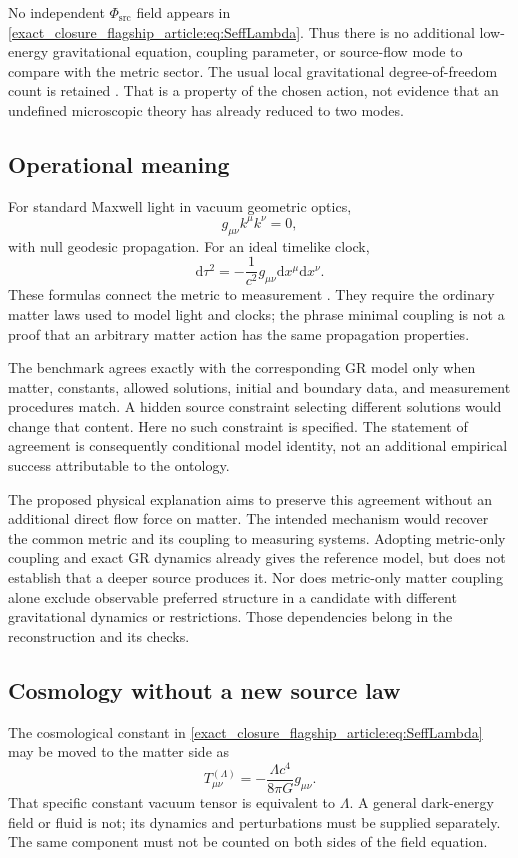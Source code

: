 \documentclass[11pt,oneside]{report}
\newcommand{\PhiSrc}{\Phi_{\mathrm{src}}}
\newcommand{\dd}{\mathrm d}
\theoremstyle{remark}
\numberwithin{definition}{chapter}
\numberwithin{proposition}{chapter}
\numberwithin{remark}{chapter}
\begin{document}
No independent $\PhiSrc$ field appears in \eqref{exact_closure_flagship_article:eq:SeffLambda}. Thus there is no additional low-energy gravitational equation, coupling parameter, or source-flow mode to compare with the metric sector. The usual local gravitational degree-of-freedom count is retained \parencite{ADM1962}. That is a property of the chosen action, not evidence that an undefined microscopic theory has already reduced to two modes.

\subsection{Operational meaning}
For standard Maxwell light in vacuum geometric optics,
\begin{equation}
g_{\mu\nu}k^\mu k^\nu=0,
\label{exact_closure_flagship_article:eq:null}
\end{equation}
with null geodesic propagation. For an ideal timelike clock,
\begin{equation}
\dd\tau^2=-\frac1{c^2}g_{\mu\nu}\dd x^\mu\dd x^\nu.
\label{exact_closure_flagship_article:eq:tau}
\end{equation}
These formulas connect the metric to measurement \parencite{Carroll1997}. They require the ordinary matter laws used to model light and clocks; the phrase minimal coupling is not a proof that an arbitrary matter action has the same propagation properties.

The benchmark agrees exactly with the corresponding GR model only when matter, constants, allowed solutions, initial and boundary data, and measurement procedures match. A hidden source constraint selecting different solutions would change that content. Here no such constraint is specified. The statement of agreement is consequently conditional model identity, not an additional empirical success attributable to the ontology.

The proposed physical explanation aims to preserve this agreement without an additional direct flow force on matter. The intended mechanism would recover the common metric and its coupling to measuring systems. Adopting metric-only coupling and exact GR dynamics already gives the reference model, but does not establish that a deeper source produces it. Nor does metric-only matter coupling alone exclude observable preferred structure in a candidate with different gravitational dynamics or restrictions. Those dependencies belong in the reconstruction and its checks.

\subsection{Cosmology without a new source law}
The cosmological constant in \eqref{exact_closure_flagship_article:eq:SeffLambda} may be moved to the matter side as
\begin{equation}
T^{(\Lambda)}_{\mu\nu}=-\frac{\Lambda c^4}{8\pi G}g_{\mu\nu}.
\end{equation}
That specific constant vacuum tensor is equivalent to $\Lambda$. A general dark-energy field or fluid is not; its dynamics and perturbations must be supplied separately. The same component must not be counted on both sides of the field equation.
\end{document}
